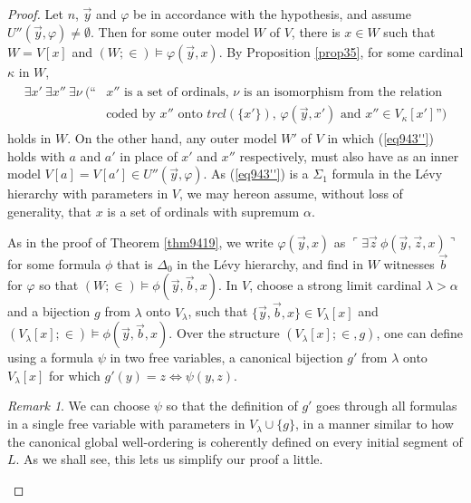 \documentclass[12pt, twoside]{memoir}
\numberwithin{equation}{section}
\theoremstyle{definition}
\theoremstyle{remark}
\newtheorem{rem}[thm]{Remark}
\theoremstyle{definition}
\theoremstyle{definition}
\theoremstyle{definition}
\theoremstyle{remark}
\begin{document}
\begin{proof}
Let $n$, $\Vec{y}$ and $\varphi$ be in accordance with the hypothesis, and assume $U''(\Vec{y}, \varphi) \neq \emptyset$. Then for some outer model $W$ of $V$, there is $x \in W$ such that $W = V[x]$ and $(W; \in) \models \varphi(\Vec{y}, x)$. By Proposition \ref{prop35}, for some cardinal $\kappa$ in $W$, 
\begin{align}
\begin{split}\label{eq943''}
    \exists x' \ \exists x'' \ \exists \nu \ (\text{``} & x'' \text{ is a set of ordinals, } \nu \text{ is an isomorphism from the relation} \\
    & \text{coded by } x'' \text{ onto } trcl(\{x'\}) \text{, } \varphi(\Vec{y}, x') \text{ and } x'' \in V_{\kappa}[x'] \text{''})
\end{split}
\end{align}
holds in $W$. On the other hand, any outer model $W'$ of $V$ in which (\ref{eq943''}) holds with $a$ and $a'$ in place of $x'$ and $x''$ respectively, must also have as an inner model $V[a] = V[a'] \in U''(\Vec{y}, \varphi)$. As (\ref{eq943''}) is a $\Sigma_1$ formula in the L\'{e}vy hierarchy with parameters in $V$, we may hereon assume, without loss of generality, that $x$ is a set of ordinals with supremum $\alpha$. 

As in the proof of Theorem \ref{thm9419}, we write $\varphi(\Vec{y}, x)$ as $\ulcorner \exists \Vec{z} \ \phi(\Vec{y}, \Vec{z}, x) \urcorner$ for some formula $\phi$ that is $\Delta_0$ in the L\'{e}vy hierarchy, and find in $W$ witnesses $\Vec{b}$ for $\varphi$ so that $(W; \in) \models \phi(\Vec{y}, \Vec{b}, x)$. In $V$, choose a strong limit cardinal $\lambda > \alpha$ and a bijection $g$ from $\lambda$ onto $V_{\lambda}$, such that $\{\Vec{y}, \Vec{b}, x\} \in V_{\lambda}[x]$ and $(V_{\lambda}[x]; \in) \models \phi(\Vec{y}, \Vec{b}, x)$. Over the structure $(V_{\lambda}[x]; \in, g)$, one can define using a formula $\psi$ in two free variables, a canonical bijection $g'$ from $\lambda$ onto $V_{\lambda}[x]$ for which $g'(y) = z \iff \psi(y, z)$. 

\begin{rem}\label{rem9414'}
We can choose $\psi$ so that the definition of $g'$ goes through all formulas in a single free variable with parameters in $V_{\lambda} \cup \{g\}$, in a manner similar to how the canonical global well-ordering is coherently defined on every initial segment of $L$. As we shall see, this lets us simplify our proof a little.
\end{rem}


\end{proof}
\end{document}
